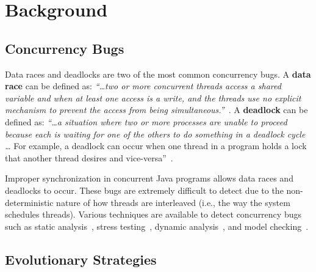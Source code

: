 \section{Background}
\label{sec:background}

\subsection{Concurrency Bugs}
\label{sec:concurrency}



Data races and deadlocks are two of the most common concurrency bugs. A \textbf{data race} can be defined as: \textit{``\ldots two or more
concurrent threads access a shared variable and when at least one access is a
write, and the threads use no explicit mechanism to prevent the access from
being simultaneous.''}~\cite{LSW07}. A \textbf{deadlock} can be defined as: \textit{``\ldots a situation where two or more
processes are unable to proceed because each is waiting for one of the others
to do something in a deadlock cycle \ldots} For example, a deadlock can occur when one
thread in a program holds a lock that another thread desires and vice-versa''~\cite{LSW07}.

Improper synchronization in concurrent Java programs allows data
races and deadlocks to occur. %
These bugs are extremely difficult to detect due to the non-deterministic
nature of how threads are interleaved (i.e., the way the system schedules threads).
Various techniques are available to detect concurrency bugs such as static
analysis~\cite{NA07,NPSG09,HP04}, stress testing~\cite{HSU03}, dynamic
analysis~\cite{JNPS09,EFN+02}, and model
checking~\cite{BHPV00,RDH03,OM03,MQB07,Holz97,JM04,HP00}.

\subsection{Evolutionary Strategies}
\label{sec:evolutionary_strategies}

